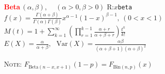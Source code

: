 \documentclass[10pt]{article}
\newenvironment{LIST}[1]{\begin{list}{}
                          { \settowidth{\labelwidth}{#1}
                            \setlength{\leftmargin}{\labelwidth}
                            \addtolength{\leftmargin}{\labelsep}
                            \setlength{\parsep}{0.5ex plus0.2ex minus0.2ex}
                            \setlength{\itemsep}{0ex plus0.2ex}
                            \renewcommand{\makelabel}[1]{##1\hfill}
                          }
                        }
                        {\end{list}}
\begin{document}
\begin{multicols}{2}
\begin{small}
\begin{enumerate}
\end{enumerate}

\vspace*{\fill}
\begin{enumerate}
\item \textcolor{red}{\bfseries\textsf{Beta}}\,$(\alpha,\beta)$,~~  
       $(\alpha>0,\beta>0)$ \hfill \textsf{R:}$x$\texttt{\color{red}beta} \\
      $f(x)=\frac{\displaystyle \Gamma(\alpha+\beta)}{\displaystyle\Gamma(\alpha)\Gamma(\beta)}
            x^{\alpha-1}(1-x)^{\beta-1},~(0<x<1)$ \\
      $M(t) = 1 + \sum_{k=1}^{\infty}\left(\prod_{r=1}^{k-1}\frac{\alpha+r}{\alpha+\beta+r}\right)
              \frac{t^k}{k!}$\\
      $E(X)=\frac{\displaystyle \alpha}{\displaystyle \alpha+\beta}$,~
            $\textrm{Var}(X) =\frac{\displaystyle\alpha\beta}{\displaystyle(\alpha+\beta+1)(\alpha+\beta)^2}$
      \begin{LIST}{\textsc{Note:}}
      \item[\textsc{Note:}] $F_{\textrm{Beta}(n-x,x+1)}(1-p)=F_{\textrm{Bin}(n,p)}(x)$
      \end{LIST}


\end{enumerate}
\end{small}
\end{multicols}
\end{document}
